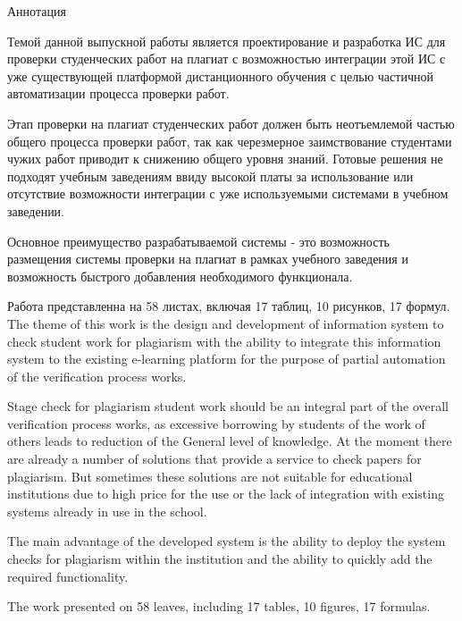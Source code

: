 \documentclass[russian, utf8]{article}
\begin{document}
\begin{center}Аннотация\end{center}

Темой данной выпускной работы является проектирование и разработка ИС для проверки студенческих работ на плагиат с возможностью интеграции этой ИС с уже существующей платформой дистанционного обучения с целью частичной автоматизации процесса проверки работ.

Этап проверки на плагиат студенческих работ должен быть неотъемлемой частью общего процесса проверки работ, так как черезмерное заимствование студентами чужих работ приводит к снижению общего уровня знаний. Готовые решения не подходят учебным заведениям ввиду высокой платы за использование или отсутствие возможности интеграции с уже используемыми системами в учебном заведении. 

Основное преимущество разрабатываемой системы - это возможность размещения системы проверки на плагиат в рамках учебного заведения и возможность быстрого добавления необходимого функционала.

Работа представленна на 58 листах, включая 17 таблиц, 10 рисунков, 17 формул. \\

The theme of this work is the design and development of information system to check student work for plagiarism with the ability to integrate this information system to the existing e-learning platform for the purpose of partial automation of the verification process works.

Stage check for plagiarism student work should be an integral part of the overall verification process works, as excessive borrowing by students of the work of others leads to reduction of the General level of knowledge. At the moment there are already a number of solutions that provide a service to check papers for plagiarism. But sometimes these solutions are not suitable for educational institutions due to high price for the use or the lack of integration with existing systems already in use in the school. 

The main advantage of the developed system is the ability to deploy the system checks for plagiarism within the institution and the ability to quickly add the required functionality.

The work presented on 58 leaves, including 17 tables, 10 figures, 17 formulas.
\end{document}
